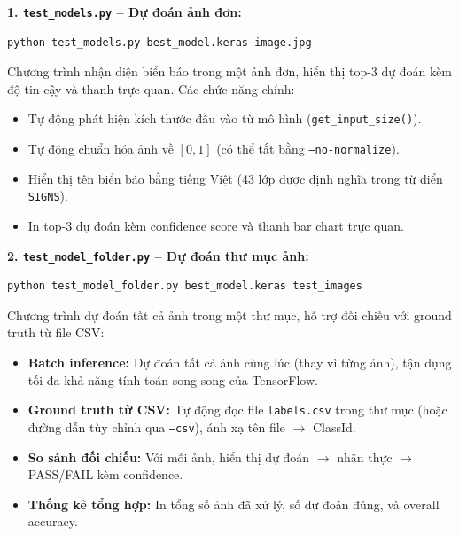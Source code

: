 \documentclass[12pt,a4paper]{article}
\begin{document}
\textbf{1. \texttt{test\_models.py} -- Dự đoán ảnh đơn:}

\begin{lstlisting}[language=Python, caption={Sử dụng \texttt{test\_models.py} để dự đoán một ảnh.}, label=lst:test_single]
python test_models.py best_model.keras image.jpg
\end{lstlisting}

Chương trình nhận diện biển báo trong một ảnh đơn, hiển thị top-3 dự đoán kèm độ tin cậy và thanh trực quan. Các chức năng chính:
\begin{itemize}
    \item Tự động phát hiện kích thước đầu vào từ mô hình (\texttt{get\_input\_size()}).
    \item Tự động chuẩn hóa ảnh về $[0, 1]$ (có thể tắt bằng \texttt{--no-normalize}).
    \item Hiển thị tên biển báo bằng tiếng Việt (43 lớp được định nghĩa trong từ điển \texttt{SIGNS}).
    \item In top-3 dự đoán kèm confidence score và thanh bar chart trực quan.
\end{itemize}

\textbf{2. \texttt{test\_model\_folder.py} -- Dự đoán thư mục ảnh:}

\begin{lstlisting}[language=Python, caption={Sử dụng \texttt{test\_model\_folder.py} để dự đoán nhiều ảnh.}, label=lst:test_folder]
python test_model_folder.py best_model.keras test_images
\end{lstlisting}

Chương trình dự đoán tất cả ảnh trong một thư mục, hỗ trợ đối chiếu với ground truth từ file CSV:
\begin{itemize}
    \item \textbf{Batch inference:} Dự đoán tất cả ảnh cùng lúc (thay vì từng ảnh), tận dụng tối đa khả năng tính toán song song của TensorFlow.
    \item \textbf{Ground truth từ CSV:} Tự động đọc file \texttt{labels.csv} trong thư mục (hoặc đường dẫn tùy chỉnh qua \texttt{--csv}), ánh xạ tên file $\to$ ClassId.
    \item \textbf{So sánh đối chiếu:} Với mỗi ảnh, hiển thị dự đoán $\to$ nhãn thực $\to$ PASS/FAIL kèm confidence.
    \item \textbf{Thống kê tổng hợp:} In tổng số ảnh đã xử lý, số dự đoán đúng, và overall accuracy.
\end{itemize}

\end{document}
